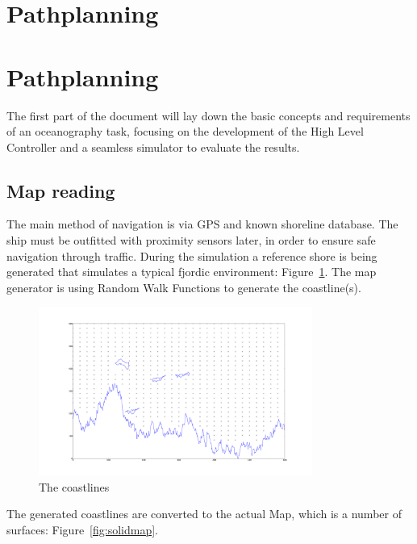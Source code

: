 \section{Pathplanning}

\section{Pathplanning} 

The first part of the document will lay down the basic concepts and requirements of an oceanography task, focusing on the development of the High Level Controller and a seamless simulator to evaluate the results.

\subsection{Map reading}

The main method of navigation is via GPS and known shoreline database. The ship must be outfitted with proximity sensors later, in order to ensure safe navigation through traffic. During the simulation a reference shore is being generated that simulates a typical fjordic environment: Figure~\ref{fig:linemap}. The map generator is using Random Walk Functions to generate the coastline(s).

\begin{figure}[H]
	\centering
	\includegraphics[width=0.8\textwidth]{img/linemap}
	\caption{The coastlines}
	\label{fig:linemap}
\end{figure}

The generated coastlines are converted to the actual Map, which is a number of surfaces: Figure~\ref{fig:solidmap}.

